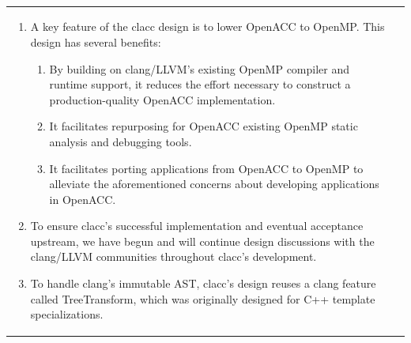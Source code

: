 ~
\vspace{-1em}

\begin{tabular}{@{\hspace{-1.5em}}p{}p{}@{}}

\begin{enumerate}

\item A key feature of the clacc design is to lower OpenACC to OpenMP.  This
design has several benefits:

\begin{enumerate}

\item By building on clang/LLVM's existing OpenMP compiler and runtime
support, it reduces the effort necessary to construct a production-quality
OpenACC implementation.

\item It facilitates repurposing for OpenACC existing OpenMP static analysis
and debugging tools.

\item It facilitates porting applications from OpenACC to OpenMP to
alleviate the aforementioned concerns about developing applications in
OpenACC.

\end{enumerate}

\item To ensure clacc's successful implementation and eventual acceptance
upstream, we have begun and will continue design discussions with the
clang/LLVM communities throughout clacc's development.

\item To handle clang's immutable AST, clacc's design reuses a clang feature
called TreeTransform, which was originally designed for C++ template
specializations.

\end{enumerate}

&


\end{tabular}
